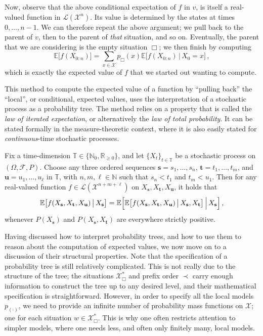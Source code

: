 \documentclass[graybox]{svmult}
\newcommand{\nats}{\mathbb{N}}
\newcommand{\natswith}{\nats_{0}}
\newcommand{\reals}{\mathbb{R}}
\newcommand{\realsnonneg}{\reals_{\geq 0}}
\newcommand{\states}{\mathcal{X}}
\newcommand{\gambles}{\mathcal{L}}
\newcommand{\timedim}{\mathbb{T}}
\begin{document}
Now, observe that the above conditional expectation of $f$ in $v$, is itself a real-valued function in $\gambles(\states^n)$. Its value is determined by the states at times $0,\ldots,n-1$. We can therefore repeat the above argument; we pull back to the parent of $v$, then to the parent of \emph{that} situation, and so on. Eventually, the parent that we are considering is the empty situation $\Box$; we then finish by computing
\begin{equation*}
\mathbb{E}\bigl[f(X_{0:n})\bigr] = \sum_{x\in\states} p_\Box(x) \mathbb{E}\bigl[f(X_{0:n})\,\big\vert\,X_0=x\bigr]\,,
\end{equation*}
which is exactly the expected value of $f$ that we started out wanting to compute.

This method to compute the expected value of a function by ``pulling back'' the ``local'', or conditional, expected values, uses the interpretation of a stochastic process as a probability tree. The method relies on a property that is called the \emph{law of iterated expectation}, or alternatively the \emph{law of total probability}. It can be stated formally in the measure-theoretic context, where it is also easily stated for \emph{continuous}-time stochastic processes.
\begin{theorem}\label{thm:loie}
Fix a time-dimension $\timedim\in\{\natswith,\realsnonneg\}$, and let $\{X_t\}_{t\in\timedim}$ be a stochastic process on $(\Omega,\mathcal{F},P)$. Choose any three ordered sequences $\mathbf{s}=s_1,\ldots,s_n$, $\mathbf{t}=t_1,\ldots,t_m$, and $\mathbf{u}=u_1,\ldots,u_\ell$ in $\timedim$, with $n,m,\ell\in\nats$ such that $s_n<t_1$ and $t_m<u_1$. Then for any real-valued function $f\in\gambles(\states^{n+m+\ell})$ on $X_\mathbf{s},X_\mathbf{t},X_\mathbf{u}$, it holds that
\begin{equation*}
\mathbb{E}\bigl[f(X_\mathbf{s},X_\mathbf{t},X_\mathbf{u})\,\big\vert\,X_\mathbf{s}\bigr] = \mathbb{E}\Bigl[\mathbb{E}\bigl[f(X_\mathbf{s},X_\mathbf{t},X_\mathbf{u})\,\big\vert\,X_\mathbf{s},X_\mathbf{t}\bigr]\,\Big\vert\,X_\mathbf{s}\Bigr]\,,
\end{equation*} 
whenever $P(X_\mathbf{s})$ and $P(X_\mathbf{s},X_\mathbf{t})$ are everywhere strictly positive.
\end{theorem}

Having discussed how to interpret probability trees, and how to use them to reason about the computation of expected values, we now move on to a discussion of their structural properties. Note that the specification of a probability tree is still relatively complicated. This is not really due to the structure of the tree; the situations $\states^*_\Box$ and prefix order $\prec$ carry enough information to construct the tree up to any desired level, and their mathematical specification is straightforward. However, in order to specify all the local models $p_{(\cdot)}$, we need to provide an infinite number of probability mass functions on $\states$; one for each situation $w\in\states^*_\Box$. This is why one often restricts attention to simpler models, where one needs less, and often only finitely many, local models.
\end{document}
